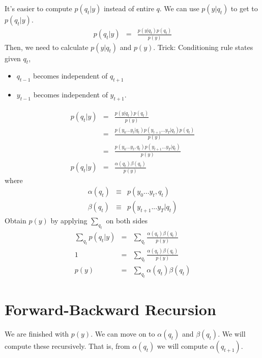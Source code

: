 It's easier to compute $p(q_t|y)$ instead of entire $q$. We can use $p(y|q_t)$
to get to $p(q_t|y)$.
\begin{eqnarray*}
p(q_t|y) &=& \frac{p(y|q_t) p(q_t)}{p(y)}
\end{eqnarray*}
Then, we need to calculate $p(y|q_t)$ and $p(y)$. Trick: Conditioning rule
states given $q_t$,
\begin{itemize}
   \item $q_{t-1}$ becomes independent of $q_{t+1}$
   \item $y_{t-1}$ becomes independent of $y_{t+1}$.
\end{itemize}



\begin{eqnarray*}
p(q_t|y) &=& \frac{p(y|q_t) p(q_t)}{p(y)}\\
&=& \frac{p(y_0...y_t|q_t)p(y_{t+1}...y_T|q_t) p(q_t)}{p(y)}\\
&=& \frac{p(y_0...y_t,q_t)p(y_{t+1}...y_T|q_t)}{p(y)}\\
p(q_t|y) &=& \frac{\alpha(q_t)\beta(q_t)}{p(y)}
\end{eqnarray*}
where
\begin{eqnarray*}
\alpha(q_t) & \equiv & p(y_0...y_t,q_t) \\
\beta(q_t) & \equiv & p(y_{t+1}...y_T|q_t)
\end{eqnarray*}
Obtain $p(y)$ by applying $\sum_{q_t}$ on both sides
\begin{eqnarray}
\sum_{q_t}p(q_t|y)  &=& \sum_{q_t} \frac{\alpha(q_t)\beta(q_t)}{p(y)} \nonumber\\
1  &=& \sum_{q_t} \frac{\alpha(q_t)\beta(q_t)}{p(y)} \nonumber\\
p(y) &=& \sum_{q_t} \alpha(q_t)\beta(q_t) \label{py}
\end{eqnarray}

\section{Forward-Backward Recursion}

We are finished with $p(y)$. We can move on to $\alpha(q_t)$ and
$\beta(q_t)$. We will compute these recursively. That is, from $\alpha(q_t)$ we
will compute $\alpha(q_{t+1})$.

